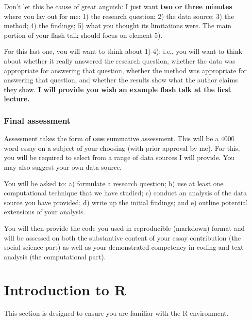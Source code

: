 \documentclass[
  letterpaper,
  DIV=11,
  numbers=noendperiod]{scrreprt}
\begin{document}
Don't let this be cause of great anguish: I just want \textbf{two or
three minutes} where you lay out for me: 1) the research question; 2)
the data source; 3) the method; 4) the findings; 5) what you thought its
limitations were. The main portion of your flash talk should focus on
element 5).

For this last one, you will want to think about 1)-4); i.e., you will
want to think about whether it really answered the research question,
whether the data was appropriate for answering that question, whether
the method was appropriate for answering that question, and whether the
results show what the author claims they show. \textbf{I will provide
you wish an example flash talk at the first lecture.}

\hypertarget{final-assessment}{%
\subsection*{Final assessment}\label{final-assessment}}

Assessment takes the form of \textbf{one} summative assessment. This
will be a 4000 word essay on a subject of your choosing (with prior
approval by me). For this, you will be required to select from a range
of data sources I will provide. You may also suggest your own data
source.

You will be asked to: a) formulate a research question; b) use at least
one computational technique that we have studied; c) conduct an analysis
of the data source you have provided; d) write up the initial findings;
and e) outline potential extensions of your analysis.

You will then provide the code you used in reproducible (markdown)
format and will be assessed on both the substantive content of your
essay contribution (the social science part) as well as your
demonstrated competency in coding and text analysis (the computational
part).


\hypertarget{introduction-to-r}{%
\chapter*{Introduction to R}\label{introduction-to-r}}

This section is designed to ensure you are familiar with the R
environment.
\end{document}
